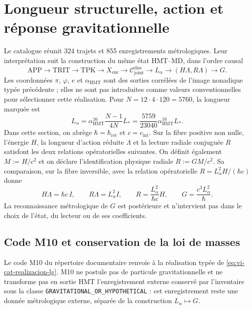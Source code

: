 \section{Longueur structurelle, action et réponse gravitationnelle}
\label{sec:vi-catalogo-dependencia-l-g}

Le catalogue réunit 324 trajets et 855 enregistrements métrologiques. Leur
interprétation suit la construction du même état HMT--MD, dans l'ordre causal
\[
 \mathrm{APP}\longrightarrow\mathrm{TRIT}\longrightarrow\mathrm{TPK}
 \longrightarrow X_{\mathrm{enr}}
 \longrightarrow\mathcal C^{\mathrm{disc}}_{\mathrm{joint}}
 \longrightarrow L_{\alpha}
 \longrightarrow(H\Lambda,R\Lambda)
 \longrightarrow G .
 \tag{A.1}\label{eq:vi-cat-cadena-lg}
\]
Les coordonnées \(\pi\), \(\varphi\), \(e\) et \(\alpha_{\mathrm{HMT}}\)
sont des sorties corrélées de l'image nonadique typée précédente ; elles ne
sont pas introduites comme valeurs conventionnelles pour sélectionner cette
réalisation. Pour \(N=12\cdot4\cdot120=5760\), la longueur marquée est
\[
 L_{\alpha}=\alpha_{\mathrm{HMT}}^{16}
 \frac{N-1}{4N}L_*
 =\frac{5759}{23040}\alpha_{\mathrm{HMT}}^{16}L_* .
 \tag{A.2}\label{eq:vi-cat-longitud-alpha}
\]
Dans cette section, on abrège \(\hbar=\hbar_{\mathrm{ret}}\) et
\(c=c_{\mathrm{int}}\). Sur la fibre positive non nulle, l'énergie \(H\),
la longueur d'action réduite \(\Lambda\) et la lecture radiale conjuguée
\(R\) satisfont les deux relations opératorielles suivantes. On définit
également \(M:=H/c^2\) et on déclare l'identification physique radiale
\(R:=GM/c^2\). Sa comparaison, sur la fibre inversible, avec la relation
opératorielle \(R=L_{\alpha}^{2}H/(\hbar c)\) donne
\[
 H\Lambda=\hbar c\,I,\qquad
 R\Lambda=L_{\alpha}^{2}I,\qquad
 R=\frac{L_{\alpha}^{2}}{\hbar c}H,\qquad
 \boxed{G=\frac{c^{3}L_{\alpha}^{2}}{\hbar}} .
 \tag{A.3}\label{eq:vi-cat-realizacion-lg}
\]
La reconnaissance métrologique de \(G\) est postérieure et n'intervient pas
dans le choix de l'état, du lecteur ou de ses coefficients.

\subsection{Code M10 et conservation de la loi de masses}
\label{sec:vi-catalogo-m10-activo}

Le code M10 du répertoire documentaire renvoie à la réalisation typée de
\eqref{eq:vi-cat-realizacion-lg}. M10 ne postule pas de particule gravitationnelle
et ne transforme pas en sortie HMT l'enregistrement externe conservé par
l'inventaire sous la classe \texttt{GRAVITATIONAL\_OR\_HYPOTHETICAL} : cet
enregistrement reste une donnée métrologique externe, séparée de la construction
\(L_{\alpha}\mapsto G\).

